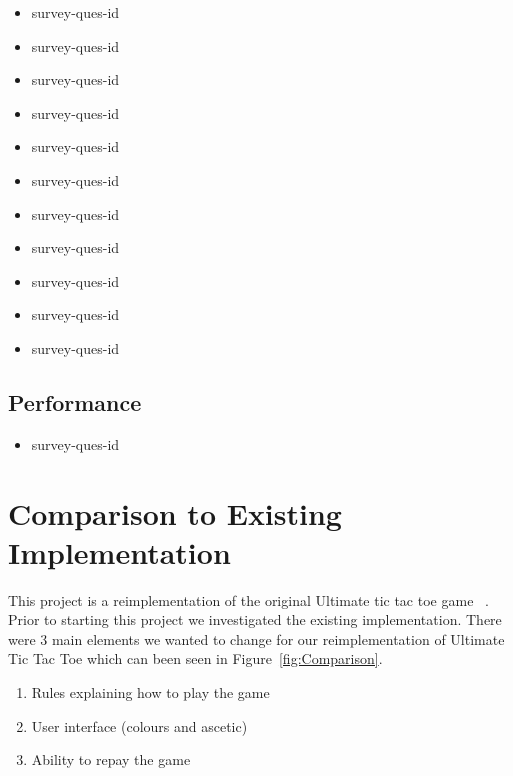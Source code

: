 \documentclass[12pt, titlepage]{article}
\newcounter{USnum}
\newcommand{\ttheUSnum}{survey-ques-id \theUSnum}
\begin{document}
\begin{itemize}

\item {\ttheUSnum \label{USq1}\\}
\item {\ttheUSnum \label{USq2}\\}
\item {\ttheUSnum \label{USq3}\\}
\item {\ttheUSnum \label{USq4}\\}
\item {\ttheUSnum \label{USq5}\\}
\item {\ttheUSnum \label{USq6}\\}
\item {\ttheUSnum \label{USq7}\\}
\item {\ttheUSnum \label{USq8}\\}
\item {\ttheUSnum \label{USq9}\\}
\item {\ttheUSnum \label{USq10}\\}
\item {\ttheUSnum \label{USq11}\\}

\end{itemize}
		
\subsection{Performance}
\begin{itemize}

\item {\ttheUSnum \label{USqxx}\\}

\end{itemize}
	
\section{Comparison to Existing Implementation}
This project is a reimplementation of the original Ultimate tic tac toe game ~\citep{githubREF}. Prior to starting this project we investigated the existing implementation. There were 3 main elements we wanted to change for our reimplementation of Ultimate Tic Tac Toe which can been seen in Figure~\ref{fig:Comparison}.
\begin{enumerate}
\item Rules explaining how to play the game
\item User interface (colours and ascetic)
\item Ability to repay the game
\end{enumerate}
\end{document}
